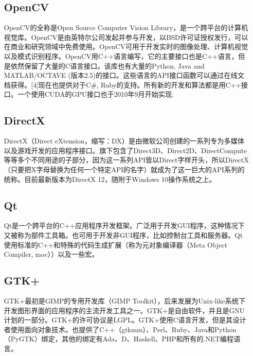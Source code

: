 \documentclass[UTF8]{article}
\begin{document}
\subsection{OpenCV}
OpenCV的全称是Open Source Computer Vision Library，是一个跨平台的计算机视觉库。OpenCV是由英特尔公司发起并参与开发，以BSD许可证授权发行，可以在商业和研究领域中免费使用。OpenCV可用于开发实时的图像处理、计算机视觉以及模式识别程序。OpenCV用C++语言编写，它的主要接口也是C++语言，但是依然保留了大量的C语言接口。该库也有大量的Python, Java and MATLAB/OCTAVE (版本2.5)的接口。这些语言的API接口函数可以通过在线文档获得。[4]现在也提供对于C\#, Ruby的支持。所有新的开发和算法都是用C++接口。一个使用CUDA的GPU接口也于2010年9月开始实现.
\subsection{DirectX}
DirectX（Direct eXtension，缩写：DX）是由微软公司创建的一系列专为多媒体以及游戏开发的应用程序接口。旗下包含了Direct3D、Direct2D、DirectCompute等等多个不同用途的子部分，因为这一系列API皆以Direct字样开头，所以DirectX（只要把X字母替换为任何一个特定API的名字）就成为了这一巨大的API系列的统称。目前最新版本为DirectX 12，随附于Windows 10操作系统之上。

\subsection{Qt}
Qt是一个跨平台的C++应用程序开发框架。广泛用于开发GUI程序，这种情况下又被称为部件工具箱。也可用于开发非GUI程序，比如控制台工具和服务器。Qt使用标准的C++和特殊的代码生成扩展（称为元对象编译器（Meta Object Compiler, moc））以及一些宏。
\subsection{GTK+}
GTK+最初是GIMP的专用开发库（GIMP Toolkit），后来发展为Unix-like系统下开发图形界面的应用程序的主流开发工具之一。GTK+是自由软件，并且是GNU计划的一部分。GTK+的许可协议是LGPL。GTK+使用C语言开发，但是其设计者使用面向对象技术。也提供了C++（gtkmm）、Perl、Ruby、Java和Python（PyGTK）绑定，其他的绑定有Ada、D、Haskell、PHP和所有的.NET编程语言。


\end{document}

